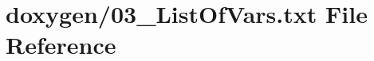 \hypertarget{03__ListOfVars_8txt}{\section{doxygen/03\+\_\+\+List\+Of\+Vars.txt File Reference}
\label{03__ListOfVars_8txt}
}
